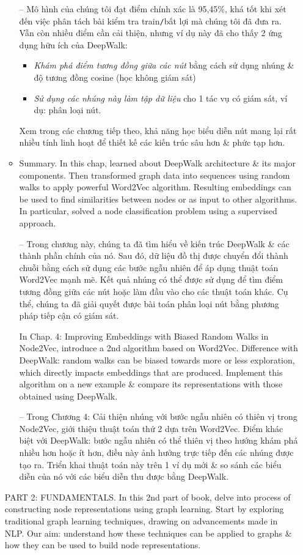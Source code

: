 \documentclass{article}
\begin{document}
\begin{itemize}
\begin{itemize}
        -- Mô hình của chúng tôi đạt điểm chính xác là 95,45\%, khá tốt khi xét đến việc phân tách bài kiểm tra train{\tt/}bất lợi mà chúng tôi đã đưa ra. Vẫn còn nhiều điểm cần cải thiện, nhưng ví dụ này đã cho thấy 2 ứng dụng hữu ích của DeepWalk:
        \begin{itemize}
            \item {\it Khám phá điểm tương đồng giữa các nút} bằng cách sử dụng nhúng \& độ tương đồng cosine (học không giám sát)
            \item {\it Sử dụng các nhúng này làm tập dữ liệu} cho 1 tác vụ có giám sát, ví dụ: phân loại nút.
        \end{itemize}
        Xem trong các chương tiếp theo, khả năng học biểu diễn nút mang lại rất nhiều tính linh hoạt để thiết kế các kiến trúc sâu hơn \& phức tạp hơn.
        \item {\sf Summary.} In this chap, learned about DeepWalk architecture \& its major components. Then transformed graph data into sequences using random walks to apply powerful Word2Vec algorithm. Resulting embeddings can be used to find similarities between nodes or as input to other algorithms. In particular, solved a node classification problem using a supervised approach.

        -- Trong chương này, chúng ta đã tìm hiểu về kiến trúc DeepWalk \& các thành phần chính của nó. Sau đó, dữ liệu đồ thị được chuyển đổi thành chuỗi bằng cách sử dụng các bước ngẫu nhiên để áp dụng thuật toán Word2Vec mạnh mẽ. Kết quả nhúng có thể được sử dụng để tìm điểm tương đồng giữa các nút hoặc làm đầu vào cho các thuật toán khác. Cụ thể, chúng ta đã giải quyết được bài toán phân loại nút bằng phương pháp tiếp cận có giám sát.

        In Chap. 4: Improving Embeddings with Biased Random Walks in Node2Vec, introduce a 2nd algorithm based on Word2Vec. Difference with DeepWalk: random walks can be biased towards more or less exploration, which directly impacts embeddings that are produced. Implement this algorithm on a new example \& compare its representations with those obtained using DeepWalk.

        -- Trong Chương 4: Cải thiện nhúng với bước ngẫu nhiên có thiên vị trong Node2Vec, giới thiệu thuật toán thứ 2 dựa trên Word2Vec. Điểm khác biệt với DeepWalk: bước ngẫu nhiên có thể thiên vị theo hướng khám phá nhiều hơn hoặc ít hơn, điều này ảnh hưởng trực tiếp đến các nhúng được tạo ra. Triển khai thuật toán này trên 1 ví dụ mới \& so sánh các biểu diễn của nó với các biểu diễn thu được bằng DeepWalk.
    \end{itemize}
    PART 2: FUNDAMENTALS. In this 2nd part of book, delve into process of constructing node representations using graph learning. Start by exploring traditional graph learning techniques, drawing on advancements made in NLP. Our aim: understand how these techniques can be applied to graphs \& how they can be used to build node representations.


\end{itemize}
\end{document}
